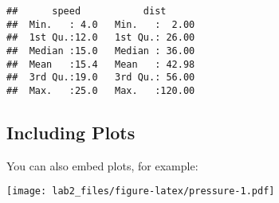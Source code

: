 \documentclass[
]{article}
\begin{document}
\begin{verbatim}
##      speed           dist       
##  Min.   : 4.0   Min.   :  2.00  
##  1st Qu.:12.0   1st Qu.: 26.00  
##  Median :15.0   Median : 36.00  
##  Mean   :15.4   Mean   : 42.98  
##  3rd Qu.:19.0   3rd Qu.: 56.00  
##  Max.   :25.0   Max.   :120.00
\end{verbatim}

\hypertarget{including-plots}{%
\subsection{Including Plots}\label{including-plots}}

You can also embed plots, for example:

\texttt{[image: lab2\_files/figure-latex/pressure-1.pdf]}
\end{document}
